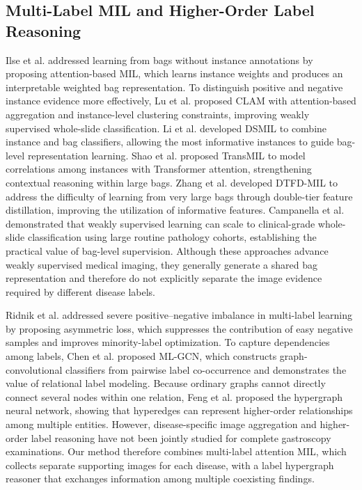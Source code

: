 \documentclass[Afour,sagev,times]{sagej}
\begin{document}
\subsection{Multi-Label MIL and Higher-Order Label Reasoning}

Ilse et al. addressed learning from bags without instance annotations by proposing attention-based MIL, which learns instance weights and produces an interpretable weighted bag representation.\cite{R10} To distinguish positive and negative instance evidence more effectively, Lu et al. proposed CLAM with attention-based aggregation and instance-level clustering constraints, improving weakly supervised whole-slide classification.\cite{R11} Li et al. developed DSMIL to combine instance and bag classifiers, allowing the most informative instances to guide bag-level representation learning.\cite{R12} Shao et al. proposed TransMIL to model correlations among instances with Transformer attention, strengthening contextual reasoning within large bags.\cite{R13} Zhang et al. developed DTFD-MIL to address the difficulty of learning from very large bags through double-tier feature distillation, improving the utilization of informative features.\cite{R14} Campanella et al. demonstrated that weakly supervised learning can scale to clinical-grade whole-slide classification using large routine pathology cohorts, establishing the practical value of bag-level supervision.\cite{R15} Although these approaches advance weakly supervised medical imaging, they generally generate a shared bag representation and therefore do not explicitly separate the image evidence required by different disease labels.

Ridnik et al. addressed severe positive--negative imbalance in multi-label learning by proposing asymmetric loss, which suppresses the contribution of easy negative samples and improves minority-label optimization.\cite{R16} To capture dependencies among labels, Chen et al. proposed ML-GCN, which constructs graph-convolutional classifiers from pairwise label co-occurrence and demonstrates the value of relational label modeling.\cite{R17} Because ordinary graphs cannot directly connect several nodes within one relation, Feng et al. proposed the hypergraph neural network, showing that hyperedges can represent higher-order relationships among multiple entities.\cite{R18} However, disease-specific image aggregation and higher-order label reasoning have not been jointly studied for complete gastroscopy examinations. Our method therefore combines multi-label attention MIL, which collects separate supporting images for each disease, with a label hypergraph reasoner that exchanges information among multiple coexisting findings.
\end{document}
